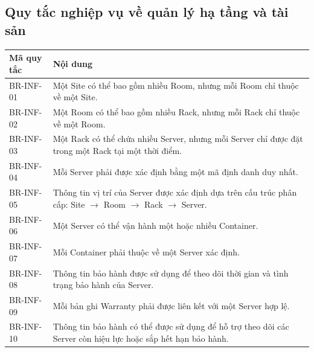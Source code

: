 \subsection{Quy tắc nghiệp vụ về quản lý hạ tầng và tài sản}
\begin{center}
\begin{longtable}{|>{\raggedright\arraybackslash}p{3.5cm}|>{\raggedright\arraybackslash}p{11.0cm}|}
\hline
\textbf{Mã quy tắc} & \textbf{Nội dung} \\ \hline
\endhead
BR-INF-01 & Một Site có thể bao gồm nhiều Room, nhưng mỗi Room chỉ thuộc về một Site. \\ \hline
BR-INF-02 & Một Room có thể bao gồm nhiều Rack, nhưng mỗi Rack chỉ thuộc về một Room. \\ \hline
BR-INF-03 & Một Rack có thể chứa nhiều Server, nhưng mỗi Server chỉ được đặt trong một Rack tại một thời điểm. \\ \hline
BR-INF-04 & Mỗi Server phải được xác định bằng một mã định danh duy nhất. \\ \hline
BR-INF-05 & Thông tin vị trí của Server được xác định dựa trên cấu trúc phân cấp: Site $\rightarrow$ Room $\rightarrow$ Rack $\rightarrow$ Server. \\ \hline
BR-INF-06 & Một Server có thể vận hành một hoặc nhiều Container. \\ \hline
BR-INF-07 & Mỗi Container phải thuộc về một Server xác định. \\ \hline
BR-INF-08 & Thông tin bảo hành được sử dụng để theo dõi thời gian và tình trạng bảo hành của Server. \\ \hline
BR-INF-09 & Mỗi bản ghi Warranty phải được liên kết với một Server hợp lệ. \\ \hline
BR-INF-10 & Thông tin bảo hành có thể được sử dụng để hỗ trợ theo dõi các Server còn hiệu lực hoặc sắp hết hạn bảo hành. \\ \hline
\end{longtable}
\end{center}

